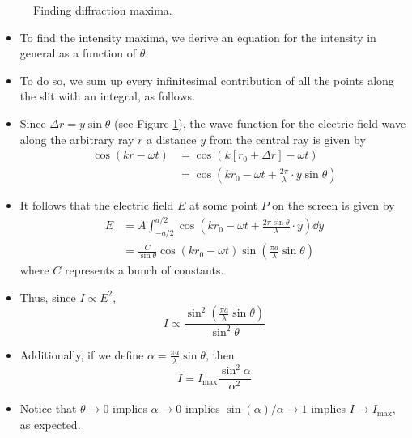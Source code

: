 \documentclass[../notes.tex]{subfiles}
\begin{document}
\begin{itemize}
\begin{figure}[h!]
        \caption{Finding diffraction maxima.}
        \label{fig:diffMaxima}
    \end{figure}
    \begin{itemize}
        \item To find the intensity maxima, we derive an equation for the intensity in general as a function of $\theta$.
        \item To do so, we sum up every infinitesimal contribution of all the points along the slit with an integral, as follows.
        \item Since $\Delta r=y\sin\theta$ (see Figure \ref{fig:diffMaxima}), the wave function for the electric field wave along the arbitrary ray $r$ a distance $y$ from the central ray is given by
        \begin{align*}
            \cos(kr-\omega t) &= \cos(k[r_0+\Delta r]-\omega t)\\
            &= \cos\left( kr_0-\omega t+\frac{2\pi}{\lambda}\cdot y\sin\theta \right)
        \end{align*}
        \item It follows that the electric field $E$ at some point $P$ on the screen is given by
        \begin{align*}
            E &= A\int_{-a/2}^{a/2}\cos\left( kr_0-\omega t+\frac{2\pi\sin\theta}{\lambda}\cdot y \right)\dd{y}\\
            &= \frac{C}{\sin\theta}\cos(kr_0-\omega t)\sin\left( \frac{\pi a}{\lambda}\sin\theta \right)
        \end{align*}
        where $C$ represents a bunch of constants.
        \item Thus, since $I\propto E^2$,
        \begin{equation*}
            I \propto \frac{\sin^2\left( \frac{\pi a}{\lambda}\sin\theta \right)}{\sin^2\theta}
        \end{equation*}
        \item Additionally, if we define $\alpha=\frac{\pi a}{\lambda}\sin\theta$, then
        \begin{equation*}
            I = I_\text{max}\frac{\sin^2\alpha}{\alpha^2}
        \end{equation*}
        \item Notice that $\theta\to 0$ implies $\alpha\to 0$ implies $\sin(\alpha)/\alpha\to 1$ implies $I\to I_\text{max}$, as expected.

\end{itemize}
\end{itemize}
\end{document}
